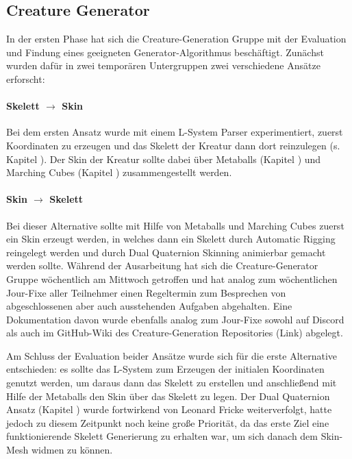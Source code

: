 \subsection{Creature Generator}
\label{subsec:creature-generation-orga}

In der ersten Phase hat sich die Creature-Generation Gruppe mit der Evaluation und Findung eines geeigneten Generator-Algorithmus beschäftigt. Zunächst wurden dafür in zwei temporären Untergruppen zwei verschiedene Ansätze erforscht:

\paragraph{Skelett $\rightarrow$ Skin} Bei dem ersten Ansatz wurde mit einem L-System Parser experimentiert, zuerst Koordinaten zu erzeugen und das Skelett der Kreatur dann dort reinzulegen (s. Kapitel ). Der Skin der Kreatur sollte dabei über Metaballs (Kapitel ) und Marching Cubes (Kapitel ) zusammengestellt werden.

\paragraph{Skin $\rightarrow$ Skelett} Bei dieser Alternative sollte mit Hilfe von Metaballs und Marching Cubes zuerst ein Skin erzeugt werden, in welches dann ein Skelett durch Automatic Rigging reingelegt werden und durch Dual Quaternion Skinning animierbar gemacht werden sollte.
\newline \newline
Während der Ausarbeitung hat sich die Creature-Generator Gruppe wöchentlich am Mittwoch getroffen und hat analog zum wöchentlichen Jour-Fixe aller Teilnehmer einen Regeltermin zum Besprechen von abgeschlossenen aber auch ausstehenden Aufgaben abgehalten. Eine Dokumentation davon wurde ebenfalls analog zum Jour-Fixe sowohl auf Discord als auch im GitHub-Wiki des Creature-Generation Repositories (Link) abgelegt.

Am Schluss der Evaluation beider Ansätze wurde sich für die erste Alternative entschieden: es sollte das L-System zum Erzeugen der initialen Koordinaten genutzt werden, um daraus dann das Skelett zu erstellen und anschließend mit Hilfe der Metaballs den Skin über das Skelett zu legen. Der Dual Quaternion Ansatz (Kapitel ) wurde fortwirkend von Leonard Fricke weiterverfolgt, hatte jedoch zu diesem Zeitpunkt noch keine große Priorität, da das erste Ziel eine funktionierende Skelett Generierung zu erhalten war, um sich danach dem Skin-Mesh widmen zu können.  

